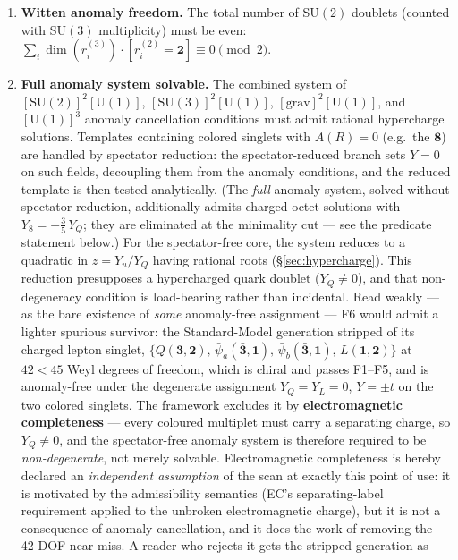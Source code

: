 \documentclass[11pt]{article}
\theoremstyle{definition}
\newcommand{\SU}{\mathrm{SU}}
\newcommand{\U}{\mathrm{U}}
\begin{document}
\begin{enumerate}[label=\textbf{F\arabic*},nosep,leftmargin=3em]
  \item \textbf{Witten anomaly freedom.}\quad
  The total number of $\SU(2)$ doublets (counted with $\SU(3)$ multiplicity)
  must be even: $\sum_i \dim(r_i^{(3)}) \cdot [r_i^{(2)} = \mathbf{2}]
  \equiv 0 \pmod{2}$.

  \item \textbf{Full anomaly system solvable.}\quad
  The combined system of $[\SU(2)]^2[\U(1)]$, $[\SU(3)]^2[\U(1)]$,
  $[\mathrm{grav}]^2[\U(1)]$, and $[\U(1)]^3$ anomaly cancellation
  conditions must admit rational hypercharge solutions.  Templates
  containing colored singlets with $A(R) = 0$ (e.g.\ the $\mathbf{8}$)
  are handled by spectator reduction: the spectator-reduced branch
  sets $Y = 0$ on such fields, decoupling them from the anomaly
  conditions, and the reduced template is then tested analytically.
  (The \emph{full} anomaly system, solved without spectator reduction,
  additionally admits charged-octet solutions with
  $Y_8 = -\tfrac{3}{5}\,Y_Q$; they are eliminated at the minimality
  cut --- see the predicate statement below.)  For the spectator-free core, the system reduces
  to a quadratic in $z = Y_u/Y_Q$ having rational roots
  (\S\ref{sec:hypercharge}).  This reduction presupposes a hypercharged
  quark doublet ($Y_Q \neq 0$), and that non-degeneracy condition is
  load-bearing rather than incidental.  Read weakly --- as the bare
  existence of \emph{some} anomaly-free assignment --- F6 would admit a
  lighter spurious survivor: the Standard-Model generation stripped of its
  charged lepton singlet, $\{Q(\mathbf{3},\mathbf{2}),\,
  \bar\psi_a(\bar{\mathbf{3}},\mathbf{1}),\,
  \bar\psi_b(\bar{\mathbf{3}},\mathbf{1}),\, L(\mathbf{1},\mathbf{2})\}$
  at $42 < 45$ Weyl degrees of freedom, which is chiral and passes
  F1--F5, and is anomaly-free under the degenerate assignment
  $Y_Q = Y_L = 0$, $Y = \pm t$ on the two colored singlets.  The framework
  excludes it by \textbf{electromagnetic completeness} --- every coloured
  multiplet must carry a separating charge, so $Y_Q \neq 0$, and the
  spectator-free anomaly system is therefore required to be
  \emph{non-degenerate}, not merely solvable.  Electromagnetic
  completeness is hereby declared an \emph{independent assumption} of
  the scan at exactly this point of use: it is motivated by the
  admissibility semantics (EC's separating-label requirement applied
  to the unbroken electromagnetic charge), but it is not a consequence
  of anomaly cancellation, and it does the work of removing the 42-DOF
  near-miss.  A reader who rejects it gets the stripped generation as

\end{enumerate}
\end{document}
